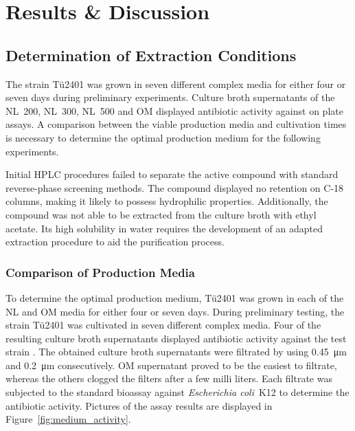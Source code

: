 
\chapter{Results \& Discussion}

\section{Determination of Extraction Conditions} %
\label{sec:determination_of_extraction_conditions}

The strain Tü2401 was grown in seven different complex media for either four or seven days during preliminary experiments.
Culture broth supernatants of the NL~200, NL~300, NL~500 and OM displayed antibiotic activity against \coli  on plate assays.
A comparison between the viable production media and cultivation times is necessary to determine the optimal production medium for the following experiments.

Initial HPLC procedures failed to separate the active compound with standard reverse-phase screening methods. The compound displayed no retention on C-18 columns, making it likely to possess hydrophilic properties.
Additionally, the compound was not able to be extracted from the culture broth with ethyl acetate. Its high solubility in water requires the development of an adapted extraction procedure to aid the purification process.

\subsection{Comparison of Production Media} %
\label{sub:comparison_of_production_media}

To determine the optimal production medium, Tü2401 was grown in each of the NL and OM media for either four or seven days.
During preliminary testing, the strain Tü2401 was cultivated in seven different complex media.
Four of the resulting culture broth supernatants displayed antibiotic activity against the test strain \coli.
The obtained culture broth supernatants were filtrated by using \SI{0.45}{\micro\meter} and \SI{0.2}{\micro\meter} consecutively.
OM supernatant proved to be the easiest to filtrate, whereas the others clogged the filters after a few milli liters.
Each filtrate was subjected to the standard bioassay against \textit{Escherichia coli}~K12 to determine the antibiotic activity.
Pictures of the assay results are displayed in Figure~\ref{fig:medium_activity}.

